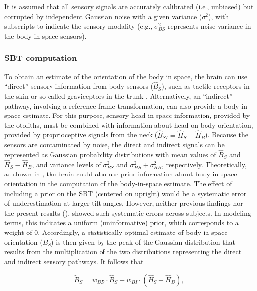 It is assumed that all sensory signals are accurately calibrated (i.e., unbiased) but corrupted by independent Gaussian noise with a given variance ($\sigma^2$), with subscripts to indicate the sensory modality (e.g., $\sigma_{BS}^2$ represents noise variance in the body-in-space sensors). 

\subsubsection{SBT computation}
\label{p1:sec:sbt_computation}
 
To obtain an estimate of the orientation of the body in space, the brain can use ``direct'' sensory information from body sensors ($\hat{B}_S$), such as tactile receptors in the skin or so-called graviceptors in the trunk \cite{mittelstaedt1997, mittelstaedt1998, vaitl2002}. Alternatively, an ``indirect'' pathway, involving a reference frame transformation, can also provide a body-in-space estimate. For this purpose, sensory head-in-space information, provided by the otoliths, must be combined with information about head-on-body orientation, provided by proprioceptive signals from the neck ($\hat{B}_{SI} = \hat{H}_S - \hat{H}_B$). Because the sensors are contaminated by noise, the direct and indirect signals can be represented as Gaussian probability distributions with mean values of $\hat{B}_S$ and $\hat{H}_S - \hat{H}_B$, and variance levels of $\sigma_{BS}^2$ and $\sigma_{HS}^2 + \sigma_{HB}^2$, respectively. Theoretically, as shown in , the brain could also use prior information about body-in-space orientation in the computation of the body-in-space estimate. The effect of including a prior on the SBT (centered on upright) would be a systematic error of underestimation at larger tilt angles. However, neither previous findings \cite{mittelstaedt1983, mast1996, jarchow1999, vanbeuzekom2001} nor the present results (), showed such systematic errors across subjects. In modeling terms, this indicates a uniform (uninformative) prior, which corresponds to a weight of 0. Accordingly, a statistically optimal estimate of body-in-space orientation ($\tilde{B}_S$) is then given by the peak of the Gaussian distribution that results from the multiplication of the two distributions representing the direct and indirect sensory pathways. It follows that

\begin{equation}
\label{p1:eqn2}
\tilde{B}_S = w_{BD} \cdot \hat{B}_S + w_{BI} \cdot (\hat{H}_S - \hat{H}_B),
\end{equation}

